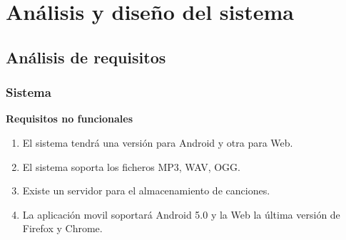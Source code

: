 \documentclass[12pt]{article}%
\begin{document}

\section{An\'alisis y dise\~no del sistema} %

\subsection{An\'alisis de requisitos}
\subsubsection{Sistema}
\textbf{Requisitos no funcionales}
\begin{enumerate}
	\item El sistema tendr\'a una versi\'on para Android y otra para Web.
	\item El sistema soporta los ficheros MP3, WAV, OGG.
	\item Existe un servidor para el almacenamiento de canciones.
	\item La aplicaci\'on movil soportar\'a Android 5.0 y la Web la \'ultima versi\'on de Firefox y Chrome.
\end{enumerate}
\end{document}
